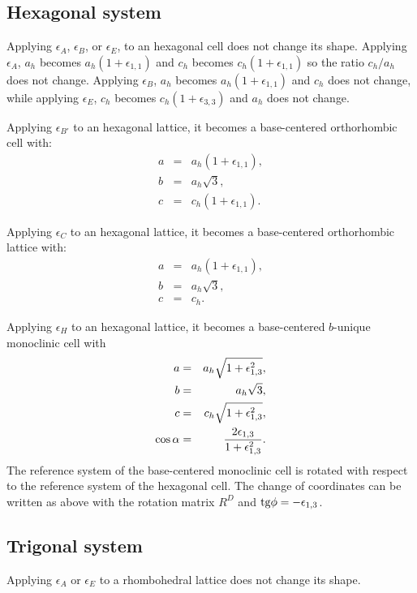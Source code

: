 \documentclass[12pt,a4paper]{article}
\begin{document}
\subsection{\color{web-blue}Hexagonal system}

Applying $\epsilon_A$, $\epsilon_B$, or $\epsilon_E$, to an hexagonal cell 
does not change its shape.
Applying $\epsilon_A$, $a_h$ becomes $a_h(1+\epsilon_{1,1})$ and
$c_h$ becomes $c_h(1+\epsilon_{1,1})$ so the ratio $c_h/a_h$ does not
change.
Applying $\epsilon_B$, $a_h$ becomes $a_h(1+\epsilon_{1,1})$ and
$c_h$ does not change, while applying $\epsilon_E$, $c_h$ 
becomes $c_h(1+\epsilon_{3,3})$ and $a_h$ does not change.

Applying $\epsilon_{B'}$ to an hexagonal lattice, it becomes
a base-centered orthorhombic cell with:
\begin{eqnarray}
a&=&a_h (1+\epsilon_{1,1}), \\
b&=&a_h \sqrt{3}, \\
c&=&c_h (1+\epsilon_{1,1}).
\end{eqnarray}

Applying $\epsilon_C$ to an hexagonal lattice, it becomes a base-centered 
orthorhombic lattice with:
\begin{eqnarray}
a&=&a_h (1+\epsilon_{1,1}), \\
b&=&a_h \sqrt{3}, \\
c&=&c_h.
\end{eqnarray}

Applying $\epsilon_H$ to an hexagonal lattice, it becomes a base-centered 
$b$-unique monoclinic cell with
\begin{eqnarray}
a&=&a_h \sqrt{1 + \epsilon_{1,3}^2}, \\
b&=&a_h \sqrt{3}, \\
c&=&c_h \sqrt{1 + \epsilon_{1,3}^2}, \\
\cos\alpha &=& {2 \epsilon_{1,3} \over 1+\epsilon_{1,3}^2}.
\end{eqnarray}
The reference system of the base-centered monoclinic cell is rotated 
with respect to the reference system of the hexagonal cell. 
The change of coordinates can be written as above with the rotation matrix 
$R^D$ and ${\rm tg}\phi=-\epsilon_{1,3}$.

\subsection{\color{web-blue}Trigonal system}

Applying $\epsilon_A$ or $\epsilon_E$ to a rhombohedral lattice does
not change its shape. 
\end{document}
